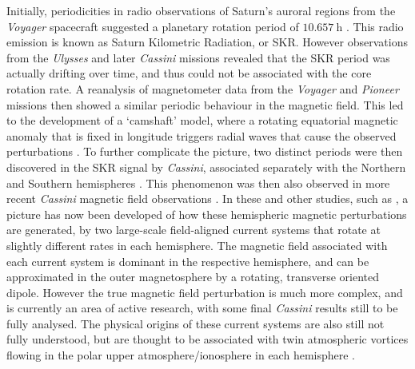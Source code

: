 Initially, periodicities in radio observations of Saturn's auroral regions from the \textit{Voyager} spacecraft suggested a planetary rotation period of $\SI{10.657}{\hour}$ \citep{desch1981}. This radio emission is known as Saturn Kilometric Radiation, or SKR. However observations from the \textit{Ulysses} \citep{lecacheux1997} and later \textit{Cassini} \citep{gurnett2005} missions revealed that the SKR period was actually drifting over time, and thus could not be associated with the core rotation rate. A reanalysis of magnetometer data from the \textit{Voyager} and \textit{Pioneer} missions then showed a similar periodic behaviour in the magnetic field. This led to the development of a `camshaft' model, where a rotating equatorial magnetic anomaly that is fixed in longitude triggers radial waves that cause the observed perturbations \citep{espinosa2003b}. To further complicate the picture, two distinct periods were then discovered in the SKR signal by \textit{Cassini}, associated separately with the Northern and Southern hemispheres \citep{gurnett2009}. This phenomenon was then also observed in more recent \textit{Cassini} magnetic field observations \citep[e.g.][]{andrews2010,provan2012}. In these and other studies, such as \citet{hunt2014}, a picture has now been developed of how these hemispheric magnetic perturbations are generated, by two large-scale field-aligned current systems that rotate at slightly different rates in each hemisphere. The magnetic field associated with each current system is dominant in the respective hemisphere, and can be approximated in the outer magnetosphere by a rotating, transverse oriented dipole. However the true magnetic field perturbation is much more complex, and is currently an area of active research, with some final \textit{Cassini} results still to be fully analysed. The physical origins of these current systems are also still not fully understood, but are thought to be associated with twin atmospheric vortices flowing in the polar upper atmosphere/ionosphere in each hemisphere \citep{jiaandkivelson2012, southwood2014, smith2016}. 

